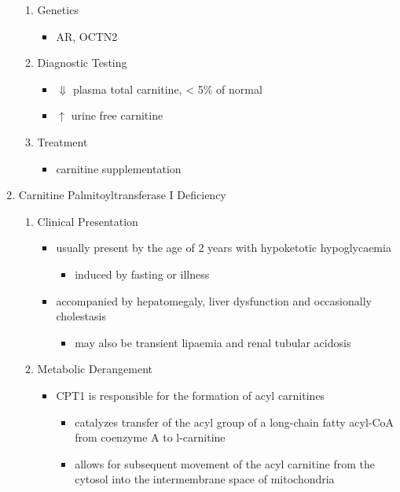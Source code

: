 \documentclass{scrartcl}
\begin{document}
\begin{enumerate}
\begin{enumerate}
\item Genetics
\label{sec:org2b17d69}
\begin{itemize}
\item AR, OCTN2
\end{itemize}
\item Diagnostic Testing
\label{sec:org291eaf3}
\begin{itemize}
\item \(\Downarrow\) plasma total carnitine, \textless{} 5\% of normal
\item \(\uparrow\) urine free carnitine
\end{itemize}
\item Treatment
\label{sec:org041156f}
\begin{itemize}
\item carnitine supplementation
\end{itemize}
\end{enumerate}
\item Carnitine Palmitoyltransferase I Deficiency
\label{sec:org4116928}
\begin{enumerate}
\item Clinical Presentation
\label{sec:org3f79d97}
\begin{itemize}
\item usually present by the age of 2 years with hypoketotic hypoglycaemia
\begin{itemize}
\item induced by fasting or illness
\end{itemize}
\item accompanied by hepatomegaly, liver dysfunction and occasionally cholestasis
\begin{itemize}
\item may also be transient lipaemia and renal tubular acidosis
\end{itemize}
\end{itemize}
\item Metabolic Derangement
\label{sec:org3427596}
\begin{itemize}
\item CPT1 is responsible for the formation of acyl carnitines
\begin{itemize}
\item catalyzes transfer of the acyl group of a long-chain fatty
acyl-CoA from coenzyme A to l-carnitine
\item allows for subsequent movement of the acyl carnitine from the
cytosol into the intermembrane space of mitochondria
\end{itemize}

\end{itemize}
\end{enumerate}
\end{enumerate}
\end{document}
